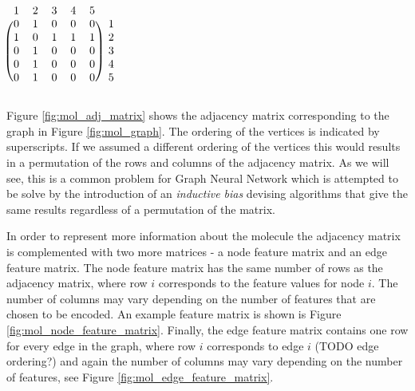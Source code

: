 \begin{minipage}{0.5\textwidth}
	\centering
		\label{fig:mol_graph}
\end{minipage}
\begin{minipage}{0.5\textwidth}
	\centering
	$
	\begin{blockarray}{cccccc}
	1 & 2 & 3 & 4 & 5 \\
	\begin{block}{(ccccc)c}
	0 & 1 & 0 & 0 & 0 & 1 \\
	1 & 0 & 1 & 1 & 1 & 2 \\
	0 & 1 & 0 & 0 & 0 & 3 \\
	0 & 1 & 0 & 0 & 0 & 4 \\
	0 & 1 & 0 & 0 & 0 & 5 \\
	\end{block}
	\end{blockarray}
	$
	\label{fig:mol_adj_matrix}
\end{minipage}
\newline\newline
Figure \ref{fig:mol_adj_matrix} shows the adjacency matrix corresponding to the graph in Figure \ref{fig:mol_graph}. The ordering of the vertices is indicated by superscripts. If we assumed a different ordering of the vertices this would results in a permutation of the rows and columns of the adjacency matrix. As we will see, this is a common problem for Graph Neural Network which is attempted to be solve by the introduction of an \emph{inductive bias} devising algorithms that give the same results regardless of a permutation of the matrix.

In order to represent more information about the molecule the adjacency matrix is complemented with two more matrices - a node feature matrix and an edge feature matrix. The node feature matrix has the same number of rows as the adjacency matrix, where row $i$ corresponds to the feature values for node $i$. The number of columns may vary depending on the number of features that are chosen to be encoded. An example feature matrix is shown is Figure \ref{fig:mol_node_feature_matrix}. Finally, the edge feature matrix contains one row for every edge in the graph, where row $i$ corresponds to edge $i$ (TODO edge ordering?) and again the number of columns may vary depending on the number of features, see Figure \ref{fig:mol_edge_feature_matrix}.

